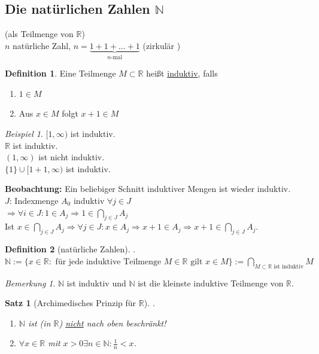 \documentclass[12pt,a4paper,titlepage]{article} %
\newtheorem{satz}{Satz}[subsection]
\theoremstyle{definition}
\newtheorem{defi}{Definition}[subsection]
\theoremstyle{remark}
\newtheorem*{bem}{Bemerkung}
\newtheorem*{bsp}{Beispiel}
\begin{document}
\subsection{Die natürlichen Zahlen $\mathbb{N}$}
(als Teilmenge von $\mathbb{R}$)\\
$n$ natürliche Zahl, $n=\underbrace{1+1+\ldots + 1}_{n\text{-mal}}$ (zirkulär \Lightning)
\begin{defi}
	Eine Teilmenge $M\subset \mathbb{R}$ heißt \underline{induktiv}, falls
	\begin{enumerate}
		\item $1\in M$
		\item Aus $x\in M$ folgt $x+1 \in M$
	\end{enumerate}
\end{defi}
\begin{bsp}
	$[1,\infty)$ ist induktiv.\\
	$\mathbb{R}$ ist induktiv.\\
	$(1,\infty)$ ist nicht induktiv.\\
	$\{1\} \cup [1+1,\infty)$ ist induktiv.
\end{bsp}
\textbf{Beobachtung:} Ein beliebiger Schnitt induktiver Mengen ist wieder induktiv.\\
$J$: Indexmenge $A_0$ induktiv $\forall j\in J$\\
$\Rightarrow \forall i\in J: 1\in A_j \Rightarrow 1\in \underset{j\in J}{\bigcap} A_j$\\
Ist $x\in \underset{j\in J}{\bigcap} A_j\Rightarrow \forall j \in J: x\in A_j \Rightarrow x+1 \in A_j \Rightarrow x+1 \in \underset{j\in J}{\bigcap} A_j$.
\begin{defi}[natürliche Zahlen] .\\ %
	$\mathbb{N} := \{x\in \mathbb{R}: \text{ für jede induktive Teilmenge } M\in\mathbb{R} \text{ gilt } x\in M\} := \underset{M\subset \mathbb{R}\text{ ist induktiv}}{\bigcap} M$
\end{defi}
\begin{bem}
	$\mathbb{N}$ ist induktiv und $\mathbb{N}$ ist die kleinste induktive Teilmenge von $\mathbb{R}$.
\end{bem}
\begin{satz}[Archimedisches Prinzip für $\mathbb{R}$] .%
	\begin{enumerate}
		\item $\mathbb{N}$ ist (in $\mathbb{R}$) \underline{nicht} nach oben beschränkt!
		\item $\forall x\in\mathbb{R}$ mit $x>0 \exists n\in \mathbb{N}: \frac{1}{n} < x$.
	\end{enumerate}
\end{satz}
\end{document}
